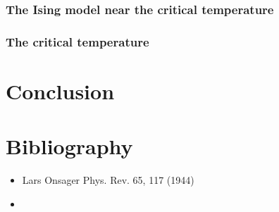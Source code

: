 \documentclass[a4paper, twoside, 11pt]{report}
\theoremstyle{theorem}
\theoremstyle{remark}
\theoremstyle{exemple}
\begin{document}
        \subsection{The Ising model near the critical temperature}
        
        \subsection{The critical temperature}



\chapter*{Conclusion}

    \paragraph{}
    

\chapter*{Bibliography}
    
    \begin{itemize}
        \item Lars Onsager Phys. Rev. 65, 117 (1944)
        \item 
    \end{itemize}
    
\end{document}
